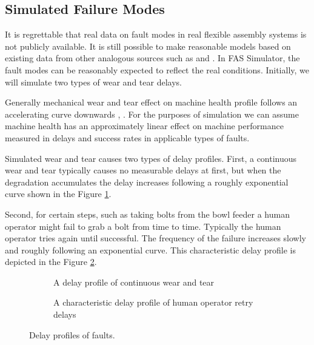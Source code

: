 \documentclass[procedia]{easychair}
\begin{document}
\subsection{Simulated Failure Modes}
It is regrettable that real data on fault modes in real flexible assembly systems is not publicly available. It is still possible to make reasonable
models based on existing data from other analogous sources such as \cite{nasaames} and \cite{tsarouhas2009classification}. In FAS Simulator, the fault modes
can be reasonably expected to reflect the real conditions. Initially, we will simulate two types of wear and tear delays.

Generally mechanical wear and tear effect on machine health profile follows
an accelerating curve downwards \cite{eker2012major}, \cite{milldataset}. For the purposes of simulation we can assume machine health has an approximately
linear effect on machine performance measured in delays and success rates in applicable types of faults.

Simulated wear and tear causes two types of delay profiles.
First, a continuous wear and tear typically causes no measurable delays at first, but when the degradation accumulates the delay increases following
a roughly exponential curve shown in the Figure \ref{figure:continuouswearandtear}.

Second, for certain steps, such as taking bolts from the bowl feeder a human operator
might fail to grab a bolt from time to time. Typically the human operator tries again until successful. The frequency of the failure increases
slowly and roughly following an exponential curve. This characteristic delay profile is depicted in the Figure \ref{figure:retrydelays}.

\begin{figure}[tb]
\tiny
\begin{subfigure}[h]{0.5\linewidth}
 \resizebox{\linewidth}{!}{}
 \caption{A delay profile of continuous wear and tear\newline}
 \label{figure:continuouswearandtear}
\end{subfigure}
\begin{subfigure}[h]{0.5\linewidth}
 \resizebox{\linewidth}{!}{}
 \caption{A characteristic delay profile of human operator retry delays}
 \label{figure:retrydelays}
\end{subfigure}
 \caption{Delay profiles of faults.}
 \label{figure:delayprofiles}
\end{figure}
\end{document}
